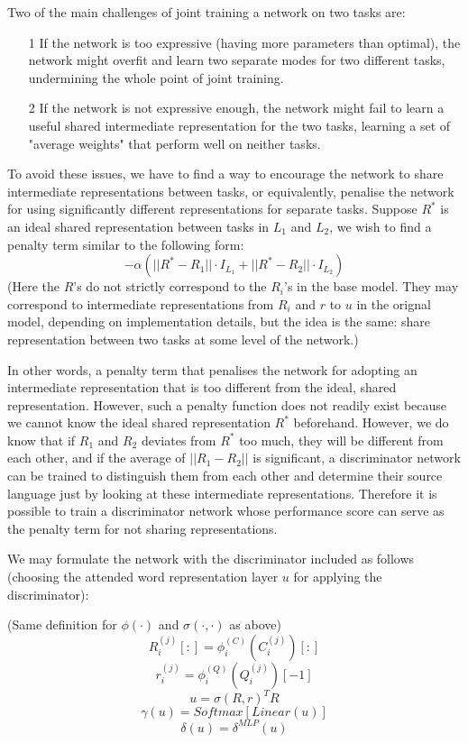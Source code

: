 \documentclass[]{article}
\begin{document}
Two of the main challenges of joint training a network on two tasks are:
\begin{itemize}
	\item[1] If the network is too expressive (having more parameters than optimal), the network might overfit and learn two separate modes for two different tasks, undermining the whole point of joint training.
	\item[2] If the network is not expressive enough, the network might fail to learn a useful shared intermediate representation for the two tasks, learning a set of "average weights" that perform well on neither tasks.
\end{itemize}

To avoid these issues, we have to find a way to encourage the network to share intermediate representations between tasks, or equivalently, penalise the network for using significantly different representations for separate tasks. Suppose $R^*$ is an ideal shared representation between tasks in $L_1$ and $L_2$, we wish to find a penalty term similar to the following form:
\[ -\alpha (||R^* - R_1|| \cdot I_{L_1} + ||R^* - R_2|| \cdot I_{L_2}) \]
(Here the $R$'s do not strictly correspond to the $R_i$'s in the base model. They may correspond to intermediate representations from $R_i$ and $r$ to $u$ in the orignal model, depending on implementation details, but the idea is the same: share representation between two tasks at some level of the network.)

In other words, a penalty term that penalises the network for adopting an intermediate representation that is too different from the ideal, shared representation. However, such a penalty function does not readily exist because we cannot know the ideal shared representation $R^*$ beforehand. However, we do know that if $R_1$ and $R_2$ deviates from $R^*$ too much, they will be different from each other, and if the average of $||R_1 - R_2||$ is significant, a discriminator network can be trained to distinguish them from each other and determine their source language just by looking at these intermediate representations. Therefore it is possible to train a discriminator network whose performance score can serve as the penalty term for not sharing representations.

We may formulate the network with the discriminator included as follows (choosing the attended word representation layer $u$ for applying the discriminator):

(Same definition for $\phi(\cdot)$ and $\sigma(\cdot, \cdot)$ as above)
\[ R_i^{(j)}[:]=\phi_i^{(C)}(C_i^{(j)})[:] \] 
\[ r_i^{(j)}=\phi_i^{(Q)}(Q_i^{(j)})[-1] \]
\[ u = \sigma(R, r)^T R \]
\[ \gamma(u) = Softmax[Linear(u)] \]
\[ \delta(u) = \delta^{MLP}(u) \]
\end{document}
